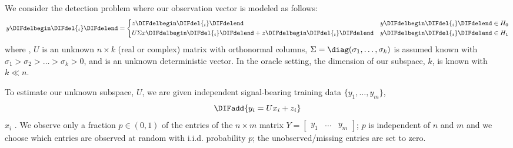 We consider the detection problem where our observation vector \DIFdelbegin {}\DIFdelend \DIFaddbegin {}\DIFaddend is modeled as follows:
\begin{equation}\label{eq:problem}
y\DIFdelbegin \DIFdel{_i}\DIFdelend =\left\{
\begin{aligned}
&z
\DIFdelbegin \DIFdel{_i
}\DIFdelend && y\DIFdelbegin \DIFdel{_i}\DIFdelend \in H_0\\
&U\Sigma x\DIFdelbegin \DIFdel{_i}\DIFdelend +z
\DIFdelbegin \DIFdel{_i
}\DIFdelend && y\DIFdelbegin \DIFdel{_i}\DIFdelend \in H_1\\
\end{aligned}\right.
\end{equation}
where \DIFdelbegin {}\DIFdelend \DIFaddbegin {}\DIFaddend , $U$ is an unknown $n\times k$ (real or complex) matrix with orthonormal columns, $\Sigma=\diag(\sigma_1,\dots,\sigma_k)$ is assumed known with $\sigma_1>\sigma_2>\dots>\sigma_k>0$, and \DIFdelbegin {}\DIFdelend \DIFaddbegin {}\DIFaddend is an unknown deterministic vector. In the oracle setting, the dimension of our subspace, $k$, is known with $k\ll n$.
\DIFdelbegin {}\DIFdelend 

To estimate our unknown subspace, $U$, we are given independent signal-bearing training data $\{y_1,\dots,y_m\}$, \DIFdelbegin {}\DIFdelend \DIFaddbegin {}\begin{equation}\label{eq:training_data}
\DIFadd{y_i = Ux_i + z_i
}\end{equation}
\DIFaddend $x_i$ \DIFaddbegin {}\DIFaddend . We observe only a fraction $p \in (0,1)$ of the entries of the $n \times m$ matrix $Y = \begin{bmatrix} y_1 & \ldots & y_{m} \end{bmatrix}$; $p$ is independent of $n$ and $m$ and we choose which entries are observed at random with i.i.d. probability $p$; the unobserved/missing entries are set to zero.

